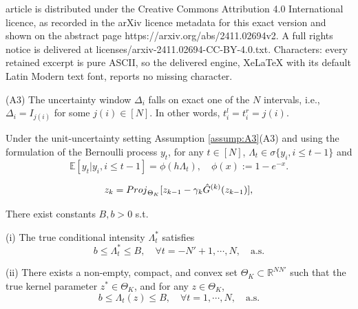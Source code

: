 \documentclass[10pt,a4paper]{amsart}
\newcommand{\E}{\mathbb{E}}
\newcommand{\R}{\mathbb{R}}
\begin{document}
article is distributed under the Creative Commons Attribution 4.0 International licence, as recorded in the arXiv licence metadata for this exact version and shown on the abstract page https://arxiv.org/abs/2411.02694v2. A full rights notice is delivered at licenses/arxiv-2411.02694-CC-BY-4.0.txt. Characters: every retained excerpt is pure ASCII, so the delivered engine, XeLaTeX with its default Latin Modern text font, reports no missing character.
\begin{assumption}\label{assump:A3}
(A3) The uncertainty window $\Delta_i$ falls on exact one of the $N$ intervals, i.e., $\Delta_i = I_{j(i)}$ for some $j(i) \in [N]$.
In other words, $t_i^l = t_i^r = j(i)$.
\end{assumption}

\begin{lemma}\label{lemma:time-only-bernoulli-glm}
Under the unit-uncertainty setting Assumption \ref{assump:A3}(A3) and using the formulation of the Bernoulli process $y_t$, 
for any $t\in [N]$, $\Lambda_t \in \sigma\{ y_i, i\le t-1\}$ and 
\begin{equation}\label{eq:time-only-bernoulli-glm}
\E [ y_t |  y_i, i\le t-1 ] = \phi( h   \Lambda_t ), 
\quad \phi(x):= 1-e^{-x}.
\end{equation}
\end{lemma}

\begin{equation}\label{eq:VI-SGD-scheme}
z_k = {\rm Proj}_{\Theta_K} [ z_{k-1} - \gamma_k \hat G^{(k)} (z_{k-1}) ],
\end{equation}

\begin{assumption}\label{assump:c1-Lambda-on-data}
There exist constants  $B, b > 0 $ s.t.

(i) The true conditional intensity $\Lambda_t^*$ satisfies 
\begin{equation}\label{eq:assump-Lamdbat-star} 
b \le \Lambda_t^* \le B, \quad \forall t= -N'+1, \cdots, N, \quad \text{a.s.}
\end{equation}

(ii)  There exists a non-empty, compact, and convex set $\Theta_K \subset \R^{NN'}$
such that the true kernel parameter  $z^* \in \Theta_K $, and for any $z \in \Theta_K$,
\begin{equation}\label{eq:assump-Lamdbat-b} 
b \le \Lambda_t( z )  \le B, \quad 
\forall t= 1, \cdots, N, \quad \text{a.s.}
\end{equation}

\end{assumption}
\end{document}
